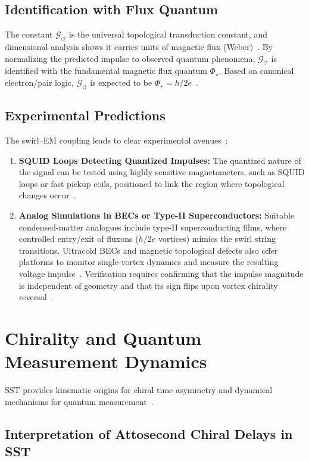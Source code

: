 \documentclass[10pt,reprint,aps,onecolumn,nofootinbib]{revtex4-2}
\begin{document}
\subsection*{Identification with Flux Quantum}

The constant $\mathcal{G}_{\circlearrowleft}$ is the universal topological transduction constant, and dimensional analysis shows it carries units of magnetic flux (Weber)~\cite{2}. By normalizing the predicted impulse to observed quantum phenomena, $\mathcal{G}_{\circlearrowleft}$ is identified with the fundamental magnetic flux quantum $\Phi_\star$. Based on canonical electron/pair logic, $\mathcal{G}_{\circlearrowleft}$ is expected to be $\Phi_\star = h/2e$~\cite{2}.

\subsection*{Experimental Predictions}

The swirl--EM coupling leads to clear experimental avenues~\cite{2}:
\begin{enumerate}
    \item \textbf{SQUID Loops Detecting Quantized Impulses:} The quantized nature of the signal can be tested using highly sensitive magnetometers, such as SQUID loops or fast pickup coils, positioned to link the region where topological changes occur~\cite{2}.
    \item \textbf{Analog Simulations in BECs or Type-II Superconductors:} Suitable condensed-matter analogues include type-II superconducting films, where controlled entry/exit of fluxons ($h/2e$ vortices) mimics the swirl string transitions. Ultracold BECs and magnetic topological defects also offer platforms to monitor single-vortex dynamics and measure the resulting voltage impulse~\cite{2}. Verification requires confirming that the impulse magnitude is independent of geometry and that its sign flips upon vortex chirality reversal~\cite{2}.
\end{enumerate}

\section{Chirality and Quantum Measurement Dynamics}
\label{sec:chirality}

SST provides kinematic origins for chiral time asymmetry and dynamical mechanisms for quantum measurement~\cite{1}.

\subsection*{Interpretation of Attosecond Chiral Delays in SST}
\end{document}
